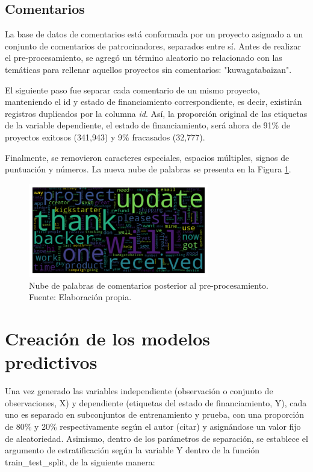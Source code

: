\subsection{Comentarios}
La base de datos de comentarios está conformada por un proyecto asignado a un conjunto de comentarios de patrocinadores, separados entre sí. Antes de realizar el pre-procesamiento, se agregó un término aleatorio no relacionado con las temáticas para rellenar aquellos proyectos sin comentarios: "kuwagatabaizan".

El siguiente paso fue separar cada comentario de un mismo proyecto, manteniendo el id y estado de financiamiento correspondiente, es decir, existirán registros duplicados por la columna \textit{id}. Así, la proporción original de las etiquetas de la variable dependiente, el estado de financiamiento, será ahora de 91\% de proyectos exitosos (341,943) y 9\% fracasados (32,777).

Finalmente, se removieron caracteres especiales, espacios múltiples, signos de puntuación y números. La nueva nube de palabras se presenta en la Figura \ref{4:fig33}.

\begin{figure}[!ht]
	\begin{center}
		\includegraphics[width=0.7\textwidth]{4/figures/comments_wordcloud_processed.png}
		\caption{Nube de palabras de comentarios posterior al pre-procesamiento. Fuente: Elaboración propia.}
		\label{4:fig33}
	\end{center}
\end{figure}


\section{Creación de los modelos predictivos}
Una vez generado las variables independiente (observación o conjunto de observaciones, X) y dependiente (etiquetas del estado de financiamiento, Y), cada uno es separado en subconjuntos de entrenamiento y prueba, con una proporción de 80\% y 20\% respectivamente según el autor (citar) y asignándose un valor fijo de aleatoriedad. Asimismo, dentro de los parámetros de separación, se establece el argumento de estratificación según la variable Y dentro de la función train\_test\_split, de la siguiente manera:

